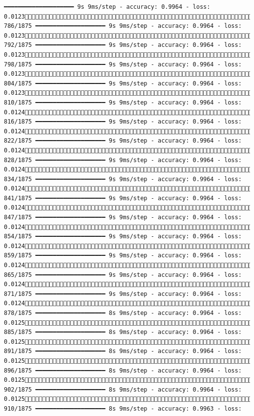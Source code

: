 \documentclass[
  letterpaper,
  DIV=11,
  numbers=noendperiod]{scrreprt}
\begin{document}
\begin{verbatim}
━━━━━━━━━━━━━━━━━━━━ 9s 9ms/step - accuracy: 0.9964 - loss: 0.0123 786/1875 ━━━━━━━━━━━━━━━━━━━━ 9s 9ms/step - accuracy: 0.9964 - loss: 0.0123 792/1875 ━━━━━━━━━━━━━━━━━━━━ 9s 9ms/step - accuracy: 0.9964 - loss: 0.0123 798/1875 ━━━━━━━━━━━━━━━━━━━━ 9s 9ms/step - accuracy: 0.9964 - loss: 0.0123 804/1875 ━━━━━━━━━━━━━━━━━━━━ 9s 9ms/step - accuracy: 0.9964 - loss: 0.0123 810/1875 ━━━━━━━━━━━━━━━━━━━━ 9s 9ms/step - accuracy: 0.9964 - loss: 0.0124 816/1875 ━━━━━━━━━━━━━━━━━━━━ 9s 9ms/step - accuracy: 0.9964 - loss: 0.0124 822/1875 ━━━━━━━━━━━━━━━━━━━━ 9s 9ms/step - accuracy: 0.9964 - loss: 0.0124 828/1875 ━━━━━━━━━━━━━━━━━━━━ 9s 9ms/step - accuracy: 0.9964 - loss: 0.0124 834/1875 ━━━━━━━━━━━━━━━━━━━━ 9s 9ms/step - accuracy: 0.9964 - loss: 0.0124 841/1875 ━━━━━━━━━━━━━━━━━━━━ 9s 9ms/step - accuracy: 0.9964 - loss: 0.0124 847/1875 ━━━━━━━━━━━━━━━━━━━━ 9s 9ms/step - accuracy: 0.9964 - loss: 0.0124 854/1875 ━━━━━━━━━━━━━━━━━━━━ 9s 9ms/step - accuracy: 0.9964 - loss: 0.0124 859/1875 ━━━━━━━━━━━━━━━━━━━━ 9s 9ms/step - accuracy: 0.9964 - loss: 0.0124 865/1875 ━━━━━━━━━━━━━━━━━━━━ 9s 9ms/step - accuracy: 0.9964 - loss: 0.0124 871/1875 ━━━━━━━━━━━━━━━━━━━━ 9s 9ms/step - accuracy: 0.9964 - loss: 0.0124 878/1875 ━━━━━━━━━━━━━━━━━━━━ 8s 9ms/step - accuracy: 0.9964 - loss: 0.0125 885/1875 ━━━━━━━━━━━━━━━━━━━━ 8s 9ms/step - accuracy: 0.9964 - loss: 0.0125 891/1875 ━━━━━━━━━━━━━━━━━━━━ 8s 9ms/step - accuracy: 0.9964 - loss: 0.0125 896/1875 ━━━━━━━━━━━━━━━━━━━━ 8s 9ms/step - accuracy: 0.9964 - loss: 0.0125 902/1875 ━━━━━━━━━━━━━━━━━━━━ 8s 9ms/step - accuracy: 0.9964 - loss: 0.0125 910/1875 ━━━━━━━━━━━━━━━━━━━━ 8s 9ms/step - accuracy: 0.9963 - loss: 
\end{verbatim}
\end{document}
